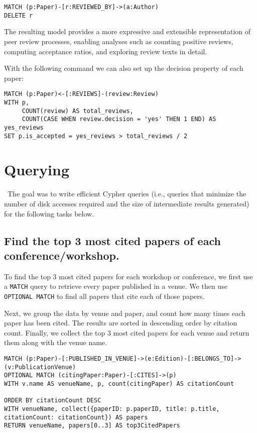 \documentclass{article}
\begin{document}
\begin{verbatim}
MATCH (p:Paper)-[r:REVIEWED_BY]->(a:Author)
DELETE r
\end{verbatim}

The resulting model provides a more expressive and extensible representation of peer review processes, enabling analyses such as counting positive reviews, computing acceptance ratios, and exploring review texts in detail.

With the following command we can also set up the decision property of each paper:

\begin{verbatim}
MATCH (p:Paper)<-[:REVIEWS]-(review:Review)
WITH p,
     COUNT(review) AS total_reviews,
     COUNT(CASE WHEN review.decision = 'yes' THEN 1 END) AS yes_reviews
SET p.is_accepted = yes_reviews > total_reviews / 2
\end{verbatim}


\section{Querying} \
The goal was to write efficient Cypher queries (i.e., queries that minimize the number of disk accesses required and the size of intermediate results generated) for the following tasks below.

\subsection{Find the top 3 most cited papers of each conference/workshop.}\label{sec_top3}
To find the top 3 most cited papers for each workshop or conference, we first use a \texttt{MATCH} query to retrieve every paper published in a venue. We then use \texttt{OPTIONAL MATCH} to find all papers that cite each of those papers.

Next, we group the data by venue and paper, and count how many times each paper has been cited. The results are sorted in descending order by citation count. Finally, we collect the top 3 most cited papers for each venue and return them along with the venue name.

\begin{verbatim}
MATCH (p:Paper)-[:PUBLISHED_IN_VENUE]->(e:Edition)-[:BELONGS_TO]->(v:PublicationVenue)
OPTIONAL MATCH (citingPaper:Paper)-[:CITES]->(p)
WITH v.name AS venueName, p, count(citingPaper) AS citationCount
                 
ORDER BY citationCount DESC
WITH venueName, collect({paperID: p.paperID, title: p.title, citationCount: citationCount}) AS papers
RETURN venueName, papers[0..3] AS top3CitedPapers
\end{verbatim}
\end{document}
